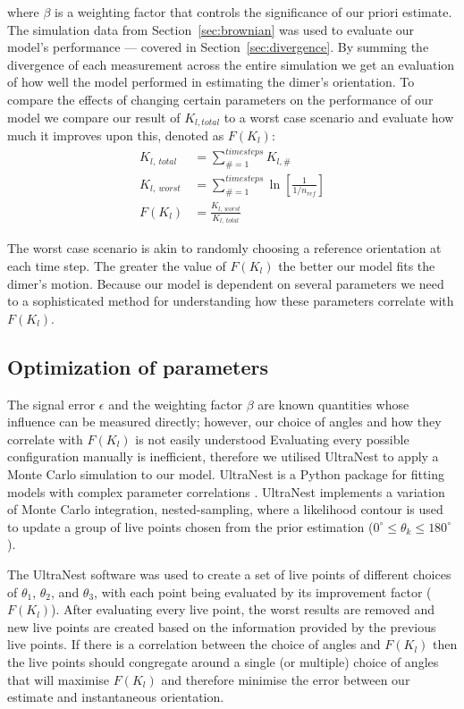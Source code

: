 \documentclass[final, 3p]{elsarticle}
\begin{document}
where $\beta$ is a weighting factor that controls the significance of our priori estimate. The simulation data from Section~\ref{sec:brownian} was used to evaluate our model's performance --- covered in Section~\ref{sec:divergence}. By summing the divergence of each measurement across the entire simulation we get an evaluation of how well the model performed in estimating the dimer's orientation. To compare the effects of changing certain parameters on the performance of our model we compare our result of $K_{l,total}$ to a worst case scenario and evaluate how much it improves upon this, denoted as $F(K_l)$:
\begin{align}
K_{l, \ total} &= \sum\limits_{\# =1}^{timesteps} K_{l,\#} \\
K_{l, \ worst} &= \sum\limits_{\#=1}^{timesteps} \ln \left[\frac{1}{1/n_{ref}} \right] \\
F(K_l) &= \frac{K_{l,\ worst}}{K_{l, \ total}}
\end{align}

The worst case scenario is akin to randomly choosing a reference orientation at each time step. The greater the value of $F(K_l)$ the better our model fits the dimer's motion. Because our model is dependent on several parameters we need to a sophisticated method for understanding how these parameters correlate with $F(K_l)$.


\subsection{Optimization of parameters}
\label{sec:ultranest}

The signal error $\epsilon$ and the weighting factor $\beta$ are known quantities whose influence can be measured directly; however, our choice of angles and how they correlate with $F(K_l)$ is not easily understood Evaluating every possible configuration manually is inefficient, therefore we utilised UltraNest to apply a Monte Carlo simulation to our model. UltraNest is a Python package for fitting models with complex parameter correlations \cite{Buchner2016Ultranest}. UltraNest implements a variation of Monte Carlo integration, nested-sampling, where a likelihood contour is used to update a group of live points chosen from the prior estimation ($0^{\circ} \leq \theta_k \leq 180^{\circ}$).

The UltraNest software was used to create a set of live points of different choices of $\theta_1$, $\theta_2$, and $\theta_3$, with each point being evaluated by its improvement factor ($F(K_l)$). After evaluating every live point, the worst results are removed and new live points are created based on the information provided by the previous live points. If there is a correlation between the choice of angles and $F(K_l)$ then the live points should congregate around a single (or multiple) choice of angles that will maximise $F(K_l)$ and therefore minimise the error between our estimate and instantaneous orientation.
\end{document}
